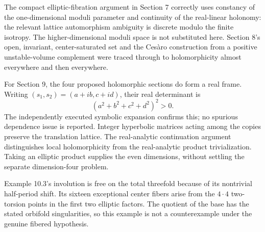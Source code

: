 \documentclass[10pt]{article}
\begin{document}
The compact elliptic-fibration argument in Section 7 correctly uses constancy of the one-dimensional moduli parameter and continuity of the real-linear holonomy: the relevant lattice automorphism ambiguity is discrete modulo the finite isotropy. The higher-dimensional moduli space is not substituted here. Section 8’s open, invariant, center-saturated set and the Cesàro construction from a positive unstable-volume complement were traced through to holomorphicity almost everywhere and then everywhere.\par
For Section 9, the four proposed holomorphic sections do form a real frame. Writing \((s_1,s_2)=(a+ib,c+id)\), their real determinant is \[(a^2+b^2+c^2+d^2)^2>0.\] The independently executed symbolic expansion confirms this; no spurious dependence issue is reported. Integer hyperbolic matrices acting among the copies preserve the translation lattice. The real-analytic continuation argument distinguishes local holomorphicity from the real-analytic product trivialization. Taking an elliptic product supplies the even dimensions, without settling the separate dimension-four problem.\par
Example 10.3’s involution is free on the total threefold because of its nontrivial half-period shift. Its sixteen exceptional center fibers arise from the \(4\cdot4\) two-torsion points in the first two elliptic factors. The quotient of the base has the stated orbifold singularities, so this example is not a counterexample under the genuine fibered hypothesis.\par
\end{document}
